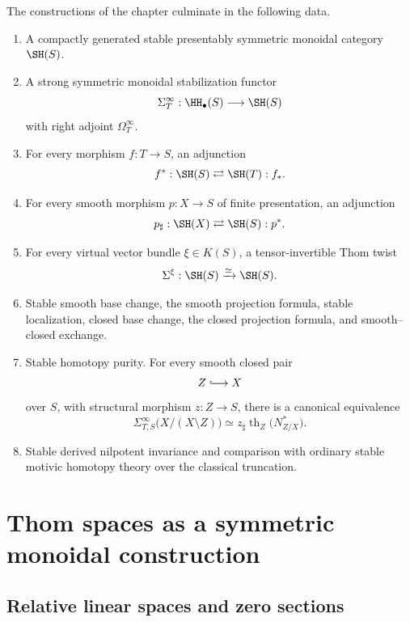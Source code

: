 The constructions of the chapter culminate in the following data.

\begin{enumerate}
    \item A compactly generated stable presentably symmetric monoidal category $\SH(S)$.

    \item A strong symmetric monoidal stabilization functor
    \[
        \Sigma_T^\infty:\HH_\bullet(S)\longrightarrow\SH(S)
    \]
    with right adjoint $\Omega_T^\infty$.

    \item For every morphism $f:T\to S$, an adjunction
    \[
        f^*:\SH(S)\rightleftarrows\SH(T):f_*.
    \]

    \item For every smooth morphism $p:X\to S$ of finite presentation, an adjunction
    \[
        p_\sharp:\SH(X)\rightleftarrows\SH(S):p^*.
    \]

    \item For every virtual vector bundle $\xi\in K(S)$, a tensor-invertible Thom twist
    \[
        \Sigma^\xi:\SH(S)\xrightarrow{\simeq}\SH(S).
    \]

    \item Stable smooth base change, the smooth projection formula, stable localization,
    closed base change, the closed projection formula, and smooth--closed exchange.

    \item Stable homotopy purity.  For every smooth closed pair
    \[
        Z\lhook\joinrel\longrightarrow X
    \]
    over \(S\), with structural morphism \(z:Z\to S\), there is a canonical
    equivalence
    \[
        \Sigma_{T,S}^\infty
        \bigl(
          X/(X\setminus Z)
        \bigr)
        \simeq
        z_\sharp
        \operatorname{th}_Z
        \bigl(
          N^*_{Z/X}
        \bigr).
    \]

    \item Stable derived nilpotent invariance and comparison with ordinary stable motivic homotopy
    theory over the classical truncation.
\end{enumerate}

\section{Thom spaces as a symmetric monoidal construction}
\label{sec:stable-thom-spaces}

\subsection{Relative linear spaces and zero sections}


